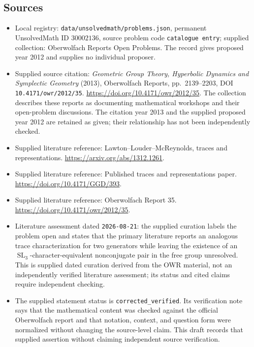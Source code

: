 \documentclass[11pt]{article}
\begin{document}
\subsection{Sources}
\begin{itemize}
\item Local registry: \texttt{data/unsolvedmath/problems.json}, permanent UnsolvedMath ID \(30002136\), source problem code \texttt{catalogue entry}; supplied collection: Oberwolfach Reports Open Problems. The record gives proposed year 2012 and supplies no individual proposer.
\item Supplied source citation: \emph{Geometric Group Theory, Hyperbolic Dynamics and Symplectic Geometry} (2013), Oberwolfach Reports, pp.~2139--2203, DOI \texttt{10.4171/owr/2012/35}. \url{https://doi.org/10.4171/owr/2012/35}. The collection describes these reports as documenting mathematical workshops and their open-problem discussions. The citation year 2013 and the supplied proposed year 2012 are retained as given; their relationship has not been independently checked.
\item Supplied literature reference: Lawton--Louder--McReynolds, traces and representations. \url{https://arxiv.org/abs/1312.1261}.
\item Supplied literature reference: Published traces and representations paper. \url{https://doi.org/10.4171/GGD/393}.
\item Supplied literature reference: Oberwolfach Report 35. \url{https://doi.org/10.4171/owr/2012/35}.
\item Literature assessment dated \texttt{2026-08-21}: the supplied curation labels the problem open and states that the primary literature reports an analogous trace characterization for two generators while leaving the existence of an \(\operatorname{SL}_3\)-character-equivalent nonconjugate pair in the free group unresolved. This is supplied dated curation derived from the OWR material, not an independently verified literature assessment; its status and cited claims require independent checking.
\item The supplied statement status is \texttt{corrected\_verified}. Its verification note says that the mathematical content was checked against the official Oberwolfach report and that notation, context, and question form were normalized without changing the source-level claim. This draft records that supplied assertion without claiming independent source verification.
\end{itemize}
\end{document}
